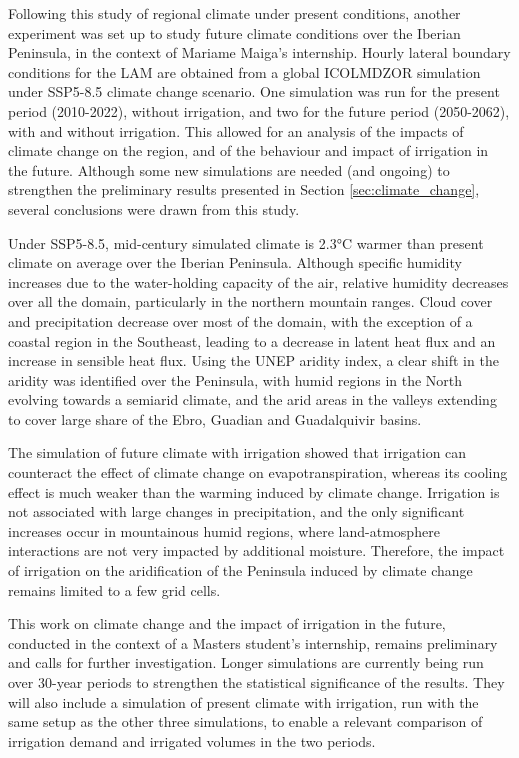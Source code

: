 \hfill

Following this study of regional climate under present conditions, another experiment was set up to study future climate conditions over the Iberian Peninsula, in the context of Mariame Maiga's internship.
Hourly lateral boundary conditions for the LAM are obtained from a global ICOLMDZOR simulation under SSP5-8.5 climate change scenario. 
One simulation was run for the present period (2010-2022), without irrigation, and two for the future period (2050-2062), with and without irrigation. This allowed for an analysis of the impacts of climate change on the region, and of the behaviour and impact of irrigation in the future. 
Although some new simulations are needed (and ongoing) to strengthen the preliminary results presented in Section \ref{sec:climate_change}, several conclusions were drawn from this study. 

Under SSP5-8.5, mid-century simulated climate is 2.3°C warmer than present climate on average over the Iberian Peninsula. Although specific humidity increases due to the water-holding capacity of the air, relative humidity decreases over all the domain, particularly in the northern mountain ranges. Cloud cover and precipitation decrease over most of the domain, with the exception of a coastal region in the Southeast, leading to a decrease in latent heat flux and an increase in sensible heat flux. Using the UNEP aridity index, a clear shift in the aridity was identified over the Peninsula, with humid regions in the North evolving towards a semiarid climate, and the arid areas in the valleys extending to cover large share of the Ebro, Guadian and Guadalquivir basins.

The simulation of future climate with irrigation showed that irrigation can counteract the effect of climate change on evapotranspiration, whereas its cooling effect is much weaker than the warming induced by climate change. Irrigation is not associated with large changes in precipitation, and the only significant increases occur in mountainous humid regions, where land-atmosphere interactions are not very impacted by additional moisture. Therefore, the impact of irrigation on the aridification of the Peninsula induced by climate change remains limited to a few grid cells.

This work on climate change and the impact of irrigation in the future, conducted in the context of a Masters student's internship, remains preliminary and calls for further investigation. Longer simulations are currently being run over 30-year periods to strengthen the statistical significance of the results. They will also include a simulation of present climate with irrigation, run with the same setup as the other three simulations, to enable a relevant comparison of irrigation demand and irrigated volumes in the two periods.

\clearpage
